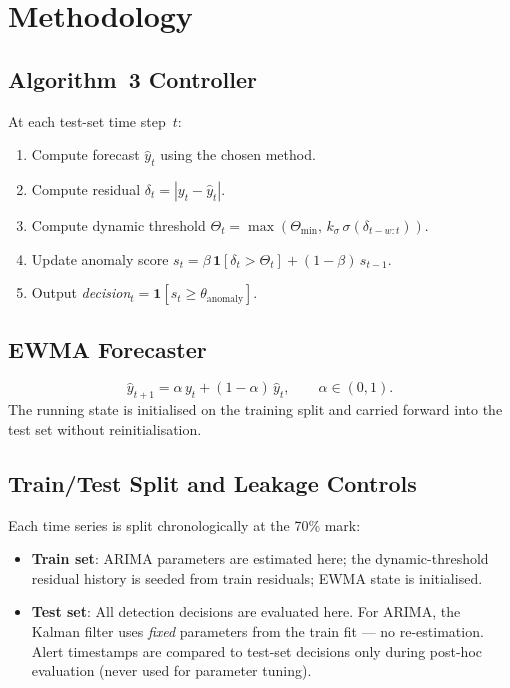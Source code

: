 \documentclass[11pt,a4paper]{article}
\begin{document}
\section{Methodology}

\subsection{Algorithm~3 Controller}

At each test-set time step~$t$:
\begin{enumerate}
  \item Compute forecast $\hat{y}_t$ using the chosen method.
  \item Compute residual $\delta_t = |y_t - \hat{y}_t|$.
  \item Compute dynamic threshold
        $\Theta_t = \max\!\left(\Theta_{\min},\, k_\sigma\,\sigma(\delta_{t-w:t})\right)$.
  \item Update anomaly score
        $s_t = \beta\,\mathbf{1}[\delta_t > \Theta_t] + (1{-}\beta)\,s_{t-1}$.
  \item Output \emph{decision}$_t = \mathbf{1}[s_t \geq \theta_{\mathrm{anomaly}}]$.
\end{enumerate}

\subsection{EWMA Forecaster}

\[
  \hat{y}_{t+1} = \alpha\,y_t + (1{-}\alpha)\,\hat{y}_t,\qquad
  \alpha \in (0,1).
\]
The running state is initialised on the training split and carried
forward into the test set without reinitialisation.

\subsection{Train/Test Split and Leakage Controls}


Each time series is split chronologically at the 70\% mark:


\begin{itemize}
  \item \textbf{Train set}: ARIMA parameters are estimated here;
        the dynamic-threshold residual history is seeded from train
        residuals; EWMA state is initialised.
  \item \textbf{Test set}: All detection decisions are evaluated here.
        For ARIMA, the Kalman filter uses \emph{fixed} parameters from
        the train fit --- no re-estimation.  Alert timestamps are compared
        to test-set decisions only during post-hoc evaluation (never used
        for parameter tuning).
\end{itemize}
\end{document}
